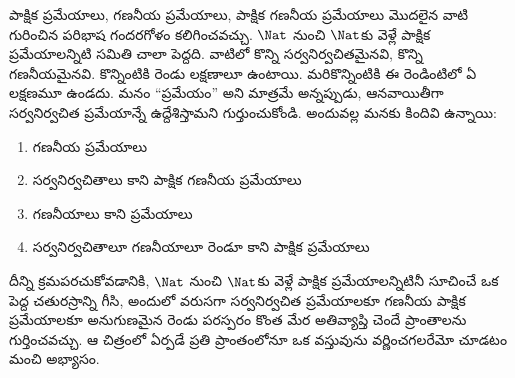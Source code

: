\documentclass[../../../include/open-logic-section]{subfiles}
\begin{document}
పాక్షిక ప్రమేయాలు, గణనీయ ప్రమేయాలు, పాక్షిక గణనీయ ప్రమేయాలు మొదలైన
వాటి గురించిన పరిభాష గందరగోళం కలిగించవచ్చు. $\Nat$ నుంచి $\Nat$కు వెళ్లే
పాక్షిక ప్రమేయాలన్నిటి సమితి చాలా పెద్దది. వాటిలో కొన్ని
సర్వనిర్వచితమైనవి, కొన్ని గణనీయమైనవి. కొన్నింటికి రెండు లక్షణాలూ
ఉంటాయి. మరికొన్నింటికి ఈ రెండింటిలో ఏ లక్షణమూ ఉండదు.
మనం ``ప్రమేయం'' అని మాత్రమే అన్నప్పుడు, ఆనవాయితీగా సర్వనిర్వచిత
ప్రమేయాన్నే ఉద్దేశిస్తామని గుర్తుంచుకోండి. అందువల్ల మనకు కిందివి ఉన్నాయి:
\begin{enumerate}
\item గణనీయ ప్రమేయాలు
\item సర్వనిర్వచితాలు కాని పాక్షిక గణనీయ ప్రమేయాలు
\item గణనీయాలు కాని ప్రమేయాలు
\item సర్వనిర్వచితాలూ గణనీయాలూ రెండూ కాని పాక్షిక ప్రమేయాలు
\end{enumerate}
దీన్ని క్రమపరచుకోవడానికి, $\Nat$ నుంచి $\Nat$కు వెళ్లే పాక్షిక
ప్రమేయాలన్నిటినీ సూచించే ఒక పెద్ద చతురస్రాన్ని గీసి, అందులో వరుసగా
సర్వనిర్వచిత ప్రమేయాలకూ గణనీయ పాక్షిక ప్రమేయాలకూ అనుగుణమైన రెండు
పరస్పరం కొంత మేర అతివ్యాప్తి చెందే ప్రాంతాలను గుర్తించవచ్చు. ఆ చిత్రంలో ఏర్పడే ప్రతి
ప్రాంతంలోనూ ఒక వస్తువును వర్ణించగలరేమో చూడటం మంచి అభ్యాసం.
\end{document}
